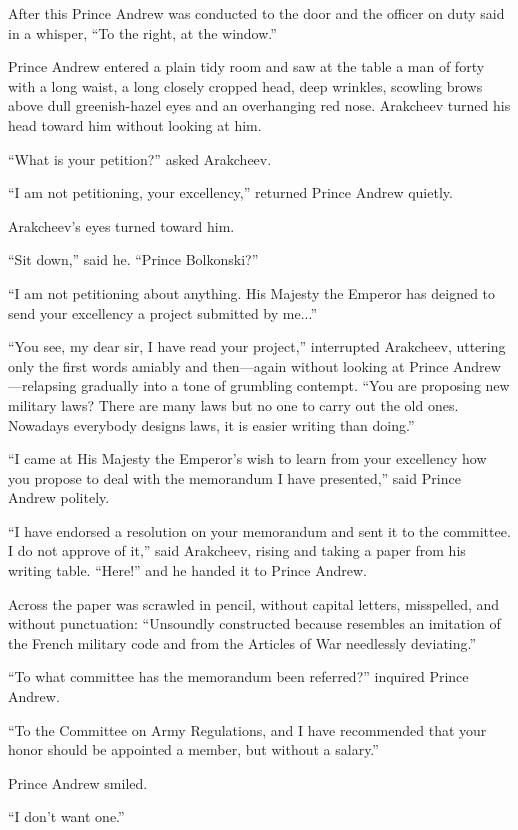 After this Prince Andrew was conducted to the door and the
officer on duty said in a whisper, ``To the right, at the
window.''

Prince Andrew entered a plain tidy room and saw at the table a
man of forty with a long waist, a long closely cropped head, deep
wrinkles, scowling brows above dull greenish-hazel eyes and an
overhanging red nose. Arakcheev turned his head toward him
without looking at him.

``What is your petition?'' asked Arakcheev.

``I am not petitioning, your excellency,'' returned Prince Andrew
quietly.

Arakcheev's eyes turned toward him.

``Sit down,'' said he. ``Prince Bolkonski?''

``I am not petitioning about anything. His Majesty the Emperor
has deigned to send your excellency a project submitted by
me...''

``You see, my dear sir, I have read your project,'' interrupted
Arakcheev, uttering only the first words amiably and then---again
without looking at Prince Andrew---relapsing gradually into a
tone of grumbling contempt.  ``You are proposing new military
laws? There are many laws but no one to carry out the old
ones. Nowadays everybody designs laws, it is easier writing than
doing.''

``I came at His Majesty the Emperor's wish to learn from your
excellency how you propose to deal with the memorandum I have
presented,'' said Prince Andrew politely.

``I have endorsed a resolution on your memorandum and sent it to
the committee. I do not approve of it,'' said Arakcheev, rising
and taking a paper from his writing table. ``Here!'' and he
handed it to Prince Andrew.

Across the paper was scrawled in pencil, without capital letters,
misspelled, and without punctuation: ``Unsoundly constructed
because resembles an imitation of the French military code and
from the Articles of War needlessly deviating.''

``To what committee has the memorandum been referred?'' inquired
Prince Andrew.

``To the Committee on Army Regulations, and I have recommended
that your honor should be appointed a member, but without a
salary.''

Prince Andrew smiled.

``I don't want one.''

